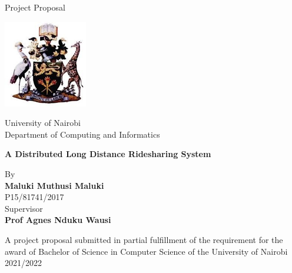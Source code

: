 \begin{center}
    Project Proposal
\end{center}

\begin{center}
    \includegraphics[scale=1]{uon.png}
\end{center}

{\vspace{7em}}

\begin{center}

    University of Nairobi \\
    Department of Computing and Informatics \\

    {\vspace{3em}}

    \textbf{A Distributed Long Distance Ridesharing System} \\

    {\vspace{3em}}

    By \\

    \textbf{ Maluki Muthusi Maluki} \\
    P15/81741/2017 \\

    {\vspace{3em}}
    Supervisor \\
    \textbf{Prof Agnes Nduku Wausi } \\

    {\vspace{7em}}

    A project proposal submitted in partial fulfillment of the requirement for the award of  Bachelor of Science in Computer Science of the University of Nairobi \\

    2021/2022

\end{center}
